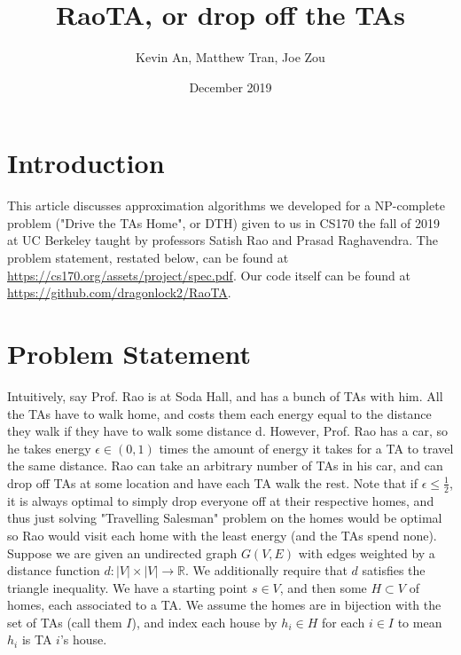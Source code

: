 \documentclass{article}
\title{RaoTA, or drop off the TAs}
\author{Kevin An, Matthew Tran, Joe Zou}
\date{December 2019}
\begin{document}
\maketitle
\pagebreak
\section{Introduction}
    This article discusses approximation algorithms we developed for a NP-complete problem ("Drive the TAs Home", or DTH) given to us in CS170 the fall of 2019 at UC Berkeley taught by professors Satish Rao and Prasad Raghavendra. The problem statement, restated below, can be found at \url{https://cs170.org/assets/project/spec.pdf}. Our code itself can be found at \url{https://github.com/dragonlock2/RaoTA}.
    
\section{Problem Statement}
    	Intuitively, say Prof. Rao is at Soda Hall, and has a bunch of TAs with him. All the TAs have to walk home, and costs them each energy equal to the distance they walk if they have to walk some distance d. However, Prof. Rao has a car, so he takes energy $\epsilon \in (0, 1)$ times the amount of energy it takes for a TA to travel the same distance. Rao can take an arbitrary number of TAs in his car, and can drop off TAs at some location and have each TA walk the rest. Note that if $\epsilon \leq \frac{1}{2}$, it is always optimal to simply drop everyone off at their respective homes, and thus just solving "Travelling Salesman" problem on the homes would be optimal so Rao would visit each home with the least energy (and the TAs spend none). 
        \\
        Suppose we are given an undirected graph $G(V, E)$ with edges weighted by a distance function $d: |V| \times |V| \xrightarrow{} \mathbb{R}$. We additionally require that $d$ satisfies the triangle inequality. We have a starting point $s \in V$, and then some $H \subset V$ of homes, each associated to a TA.  We assume the homes are in bijection with the set of TAs (call them $I$), and index each house by $h_i \in H$ for each $i \in I$ to mean $h_i$ is TA $i$'s house.
\end{document}
